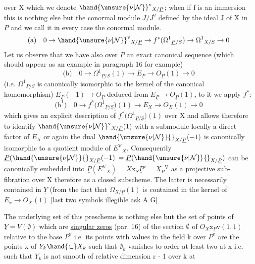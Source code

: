 
over X which we denote $\hand{\unsure{\nu|\mathcal{N}}}^{\mathrm{v}}{}_{X/\underline{P}}$; when if f is an immersion this is
nothing else but the conormal module $J/J^2$ defined by the ideal J
of X in $\underline{P}$ and we call it in every case the conormal module.
\[ \text{(a)}\quad 0 \rightarrow \hand{\unsure{\nu|\mathcal{N}}}^{\mathrm{v}}{}_{X/\underline{P}} \rightarrow f^*(\Omega^1{}_{\underline{P}/S}) \rightarrow \Omega^1{}_{X/S} \rightarrow 0 \]
Let us observe that we have also over $\underline{P}$ an exact canonical
sequence (which should appear as an example in paragraph 16 for
example)
\[ \text{(b)}\quad 0 \rightarrow \Omega^1{}_{\underline{P}/S}(1) \rightarrow E_{\underline{P}} \rightarrow O_{\underline{P}}(1) \rightarrow 0 \]
(i.e. $\Omega^1{}_{\underline{P}/S}$ is canonically isomorphic to the kernel of the
canonical homomorphism) $E_{\underline{P}}(-1) \rightarrow O_{\underline{P}}$ deduced from
$E_{\underline{P}} \rightarrow O_{\underline{P}}(1)$, to it we apply $f^*$:
\[ \text{(b}^1\text{)}\quad 0 \rightarrow f^*(\Omega^1{}_{\underline{P}/\underline{S}}\underline{)}(1) \rightarrow E_X \rightarrow O_X(1) \rightarrow 0 \]
which gives an explicit description of $f^*(\Omega^1{}_{\underline{P}/\underline{S}}\underline{)}(1)$ over X and
allows therefore to identify $\hand{\unsure{\nu|\mathcal{N}}}^{\mathrm{v}}{}_{X/\underline{P}}(1)$ with a submodule locally a
direct factor of $E_X$ or again the dual $\hand{\unsure{\nu|\mathcal{N}}}{}_{X/\underline{P}}(-1)$ is canonically
isomorphic to a quotient module of $E^{\mathrm{V}}{}_X$. Consequently $\underline{P}(\hand{\unsure{\nu|\mathcal{N}}}{}_{X/\underline{P}}(-1)$
$= \underline{P}(\hand{\unsure{\nu|\mathcal{N}}}{}_{X/\underline{P}})$ can be canonically embedded into $\underline{P}(E^{\mathrm{V}}{}_X) = X\mathrm{x}_S\underline{P}^{\mathrm{v}} = X_{\underline{P}}{}^{\mathrm{V}}$
as a projective sub-fibration over X therefore as a closed
subscheme. The latter is necessarily contained in $\underline{Y}$ (from the
fact that $\Omega_{X/\underline{P}}(1)$ is contained in the kernel of $E_x \rightarrow O_X(1)$ [last
two symbols illegible ask A G]

The underlying set of this prescheme is nothing else but the
set of points of $\underline{Y} = V(\emptyset)$ which are \uline{singular zeros} (par. 16) of
the section $\emptyset$ of $O_X\mathrm{x}_{\underline{P}}\mathrm{v}(1, 1)$ relative to the base $\underline{P}^{\mathrm{v}}$ i.e. its
points with values in the field k over $\underline{P}^{\mathrm{v}}$ are the points x of
$Y_k \hand{\subset} X_k$ such that $\emptyset_k$ vanishes to order at least two at x i.e.
such that $Y_k$ is not smooth of relative dimension r - 1 over k at
